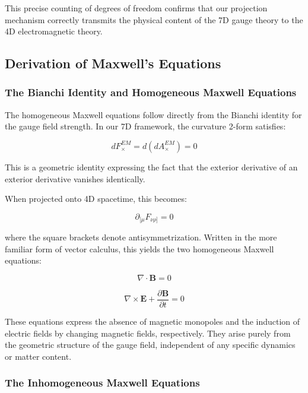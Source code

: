 \documentclass{article}
\begin{document}
This precise counting of degrees of freedom confirms that our projection mechanism correctly transmits the physical content of the 7D gauge theory to the 4D electromagnetic theory.

\subsection{Derivation of Maxwell's Equations}

\subsubsection{The Bianchi Identity and Homogeneous Maxwell Equations}

The homogeneous Maxwell equations follow directly from the Bianchi identity for the gauge field strength. In our 7D framework, the curvature 2-form satisfies:

\begin{equation}
dF^{EM}_{\times} = d(dA^{EM}_{\times}) = 0
\end{equation}

This is a geometric identity expressing the fact that the exterior derivative of an exterior derivative vanishes identically.

When projected onto 4D spacetime, this becomes:

\begin{equation}
\partial_{[\mu}F_{\nu\rho]} = 0
\end{equation}

where the square brackets denote antisymmetrization. Written in the more familiar form of vector calculus, this yields the two homogeneous Maxwell equations:

\begin{equation}
\nabla \cdot \mathbf{B} = 0
\end{equation}

\begin{equation}
\nabla \times \mathbf{E} + \frac{\partial \mathbf{B}}{\partial t} = 0
\end{equation}

These equations express the absence of magnetic monopoles and the induction of electric fields by changing magnetic fields, respectively. They arise purely from the geometric structure of the gauge field, independent of any specific dynamics or matter content.

\subsubsection{The Inhomogeneous Maxwell Equations}
\end{document}
